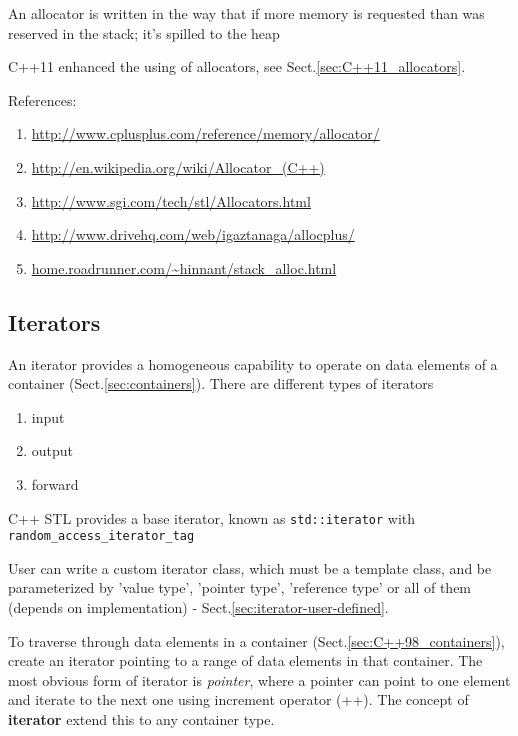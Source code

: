 \begin{mdframed}
An allocator is written in the way that if more memory is requested than was
reserved in the stack; it's spilled to the heap

\end{mdframed}


C++11 enhanced the using of allocators, see Sect.\ref{sec:C++11_allocators}.

References:
\begin{enumerate}
  \item \url{http://www.cplusplus.com/reference/memory/allocator/}
  \item \url{http://en.wikipedia.org/wiki/Allocator_(C++)}
  \item \url{http://www.sgi.com/tech/stl/Allocators.html}
  \item \url{http://www.drivehq.com/web/igaztanaga/allocplus/}
  \item \url{home.roadrunner.com/~hinnant/stack_alloc.html}
\end{enumerate}


\subsection{Iterators}
\label{sec:C++98_iterators}
\label{sec:iterator}


An iterator provides a homogeneous capability to operate on data elements of a
container (Sect.\ref{sec:containers}). There are different types of iterators
\begin{enumerate}
  \item input
  
  \item output
  
  \item forward
\end{enumerate}

C++ STL provides a base iterator, known as \verb!std::iterator! with 
\verb!random_access_iterator_tag! 

User can write a custom iterator class, which must be a template class, and be
parameterized by 'value type', 'pointer type', 'reference type' or all of them
(depends on implementation) - Sect.\ref{sec:iterator-user-defined}.

To traverse through data elements in a container
(Sect.\ref{sec:C++98_containers}), create an iterator pointing to a range of
data elements in that container. The most obvious form of iterator is {\it
pointer}, where a pointer can point to one element and iterate to the next one
using increment operator (++). The concept of {\bf iterator} extend this to any
container type.


